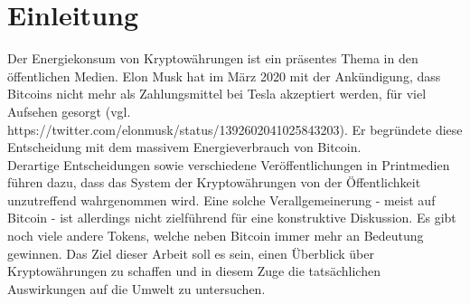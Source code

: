 \documentclass[12pt]{article}
\begin{document}
    \renewcommand{\mytitle}{Entwicklung und Bewertung eines Kennzahlen-\\systems für nachhaltige Kryptowährungen}%
\renewcommand{\myauthor}{Michael Eing, Vanessa Kriebel,\\Timo Stovermann, Bastian Wynk}%
\renewcommand{\headheight}{27pt}%



    \frontmatter%

   
    \renewcommand{\plaintitle}{Inhaltsverzeichnis}%
    {\def\makebox[#1][#2]#3{#3}%
        \tableofcontents
    }
	\clearpage
	
	\renewcommand{\plaintitle}{Abbildungsverzeichnis}
    {\def\makebox[#1][#2]#3{#3}%
        \listoffigures
    }    
    \clearpage

    \renewcommand{\plaintitle}{Abkürzungsverzeichnis}
    \printabbreviations%
    \clearpage
    

    
    \mainmatter%
    
    \useInlineCites

	\part{Einleitung}
Der Energiekonsum von Kryptowährungen ist ein präsentes Thema in den öffentlichen Medien. Elon Musk hat im März 2020 mit der Ankündigung, dass Bitcoins nicht mehr als Zahlungsmittel bei Tesla akzeptiert werden, für viel Aufsehen gesorgt (vgl. https://twitter.com/elonmusk/status/1392602041025843203). Er begründete diese Entscheidung mit dem massivem Energieverbrauch von Bitcoin.\\
Derartige Entscheidungen sowie verschiedene Veröffentlichungen in Printmedien führen dazu, dass das System der Kryptowährungen von der Öffentlichkeit unzutreffend wahrgenommen wird. Eine solche Verallgemeinerung - meist auf Bitcoin - ist allerdings nicht zielführend für eine konstruktive Diskussion. Es gibt noch viele andere Tokens, welche neben Bitcoin immer mehr an Bedeutung gewinnen. Das Ziel dieser Arbeit soll es sein, einen Überblick über Kryptowährungen zu schaffen und in diesem Zuge die tatsächlichen Auswirkungen auf die Umwelt zu untersuchen.
\end{document}
